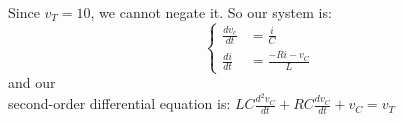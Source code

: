 \documentclass[preview]{standalone}
\begin{document}
\begin{center}
\raggedright
                    Since $v_T = 10$, we cannot negate it. So our system is:
                    \[
                    \left\{
                    \begin{aligned}
                        \frac{dv_c}{dt} &= \frac{i}{C} \\
                        \frac{di}{dt} &= \frac{-Ri - v_C}{L}
                    \end{aligned}
                    \right.
                    \] and our \\
                    second-order differential equation is: 
                        $ LC\frac{d^2v_C}{dt} + RC\frac{dv_C}{dt} + v_C = v_T $
\end{center}
\end{document}

